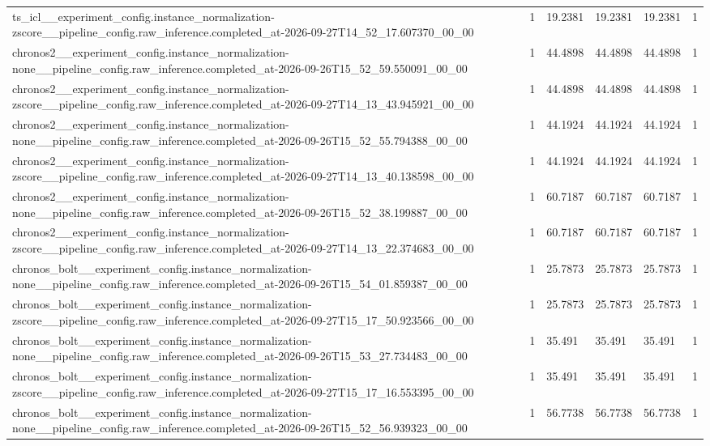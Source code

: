 \begin{tabular}{llllll}
ts\_icl\_\_experiment\_config.instance\_normalization-zscore\_\_pipeline\_config.raw\_inference.completed\_at-2026-09-27T14\_52\_17.607370\_00\_00 & 1 & 19.2381 & 19.2381 & 19.2381 & 1 \\
chronos2\_\_experiment\_config.instance\_normalization-none\_\_pipeline\_config.raw\_inference.completed\_at-2026-09-26T15\_52\_59.550091\_00\_00 & 1 & 44.4898 & 44.4898 & 44.4898 & 1 \\
chronos2\_\_experiment\_config.instance\_normalization-zscore\_\_pipeline\_config.raw\_inference.completed\_at-2026-09-27T14\_13\_43.945921\_00\_00 & 1 & 44.4898 & 44.4898 & 44.4898 & 1 \\
chronos2\_\_experiment\_config.instance\_normalization-none\_\_pipeline\_config.raw\_inference.completed\_at-2026-09-26T15\_52\_55.794388\_00\_00 & 1 & 44.1924 & 44.1924 & 44.1924 & 1 \\
chronos2\_\_experiment\_config.instance\_normalization-zscore\_\_pipeline\_config.raw\_inference.completed\_at-2026-09-27T14\_13\_40.138598\_00\_00 & 1 & 44.1924 & 44.1924 & 44.1924 & 1 \\
chronos2\_\_experiment\_config.instance\_normalization-none\_\_pipeline\_config.raw\_inference.completed\_at-2026-09-26T15\_52\_38.199887\_00\_00 & 1 & 60.7187 & 60.7187 & 60.7187 & 1 \\
chronos2\_\_experiment\_config.instance\_normalization-zscore\_\_pipeline\_config.raw\_inference.completed\_at-2026-09-27T14\_13\_22.374683\_00\_00 & 1 & 60.7187 & 60.7187 & 60.7187 & 1 \\
chronos\_bolt\_\_experiment\_config.instance\_normalization-none\_\_pipeline\_config.raw\_inference.completed\_at-2026-09-26T15\_54\_01.859387\_00\_00 & 1 & 25.7873 & 25.7873 & 25.7873 & 1 \\
chronos\_bolt\_\_experiment\_config.instance\_normalization-zscore\_\_pipeline\_config.raw\_inference.completed\_at-2026-09-27T15\_17\_50.923566\_00\_00 & 1 & 25.7873 & 25.7873 & 25.7873 & 1 \\
chronos\_bolt\_\_experiment\_config.instance\_normalization-none\_\_pipeline\_config.raw\_inference.completed\_at-2026-09-26T15\_53\_27.734483\_00\_00 & 1 & 35.491 & 35.491 & 35.491 & 1 \\
chronos\_bolt\_\_experiment\_config.instance\_normalization-zscore\_\_pipeline\_config.raw\_inference.completed\_at-2026-09-27T15\_17\_16.553395\_00\_00 & 1 & 35.491 & 35.491 & 35.491 & 1 \\
chronos\_bolt\_\_experiment\_config.instance\_normalization-none\_\_pipeline\_config.raw\_inference.completed\_at-2026-09-26T15\_52\_56.939323\_00\_00 & 1 & 56.7738 & 56.7738 & 56.7738 & 1 \\

\end{tabular}
